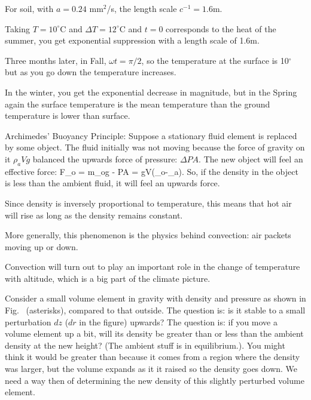 \documentclass[11pt]{book}
\begin{document}
\bee
\item For soil, with $a=0.24$ mm$^2$/s, the length scale $c^{-1}= 1.6$m. 
\item Taking $T=10^\circ$C and $\Delta T=12^\circ$C and $t=0$ corresponds to the heat of the summer, you get exponential suppression with a length scale of 1.6m.
\item Three months later, in Fall, $\omega t=\pi/2$, so the temperature at the surface is 10$^\circ$ but as you go down the temperature increases.
\item In the winter, you get the exponential decrease in magnitude, but in the Spring again the surface temperature is the mean temperature than the ground temperature is lower than surface.
\eee




\bei
\item Archimedes' Buoyancy Principle: Suppose a stationary fluid element is replaced by some object. The fluid initially was not moving because the force of gravity on it $\rho_aVg$ balanced the upwards force of pressure: $\Delta P A$. The new object will feel an effective force:
\be
F_{\rm o} = m_og - \Delta PA = gV\left(\rho_o-\rho_a\right).\ee
So, if the density in the object is less than the ambient fluid, it will feel an upwards force. 
\item Since density is inversely proportional to temperature, this means that hot air will rise as long as the density remains constant.
\item More generally, this phenomenon is the physics behind convection: air packets moving up or down. 
\item Convection will turn out to play an important role in the change of temperature with altitude, which is a big part of the climate picture.
\eei

Consider a small volume element in gravity with density and pressure as shown in Fig.~ (asterisks), compared to that outside. The question is: is it stable to a small perturbation $dz$ ($dr$ in the figure) upwards? The question is: if you move a volume element up a bit, will its density be greater than or less than the ambient density at the new height? (The ambient stuff is in equilibrium.). You might think it would be greater than because it comes from a region where the density was larger, but the volume expands as it it raised so the density goes down. We need a way then of determining the new density of this slightly perturbed volume element.
\end{document}
